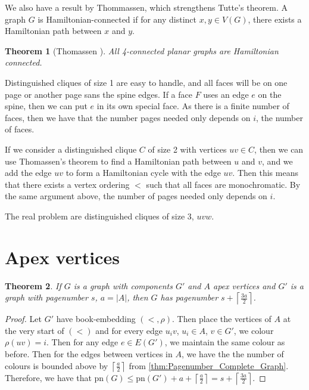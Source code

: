 \documentclass[]{report}
\newcommand{\pn}{\text{pn}}
\newtheorem{theorem}{Theorem}
\theoremstyle{definition}
\numberwithin{theorem}{section}
\numberwithin{equation}{section}
\begin{document}
We also have a result by Thommassen, which strengthens Tutte's theorem. A graph $G$ is Hamiltonian-connected if for any distinct $x, y \in V(G)$, there exists a Hamiltonian path between $x$ and $y$.
\begin{theorem}[Thomassen \cite{thomassenTheoremPathsPlanar1983}]\label{thm:4 Connected Planar Ham-Connected}
	All 4-connected planar graphs are Hamiltonian connected.
\end{theorem}
Distinguished cliques of size 1 are easy to handle, and all faces will be on one page or another page sans the spine edges. If a face $F$ uses an edge $e$ on the spine, then we can put $e$ in its own special face. As there is a finite number of faces, then we have that the number pages needed only depends on $i$, the number of faces.

If we consider a distinguished clique $C$ of size 2 with vertices $uv \in C$, then we can use Thomassen's theorem to find a Hamiltonian path between $u$ and $v$, and we add the edge $uv$ to form a Hamiltonian cycle with the edge $uv$. Then this means that there exists a vertex ordering $<$ such that all faces are monochromatic. By the same argument above, the number of pages needed only depends on $i$.

The real problem are distinguished cliques of size $3$, $uvw$. 

\section{Apex vertices}
\begin{theorem}
	If $G$ is a graph with components $G'$ and $A$ apex vertices and $G'$ is a graph with pagenumber $s$, $a = |A|$, then $G$ has pagenumber $s + \left\lceil \frac{3a}{2}\right\rceil$. 
\end{theorem}
\begin{proof}
	Let $G'$ have book-embedding $(<, \rho)$. Then place the vertices of $A$ at the very start of $(<)$ and for every edge $u_iv$, $u_i \in A$, $v \in G'$, we colour $\rho(uv) = i$. Then for any edge $e \in E(G')$, we maintain the same colour as before. Then for the edges between vertices in $A$, we have the the number of colours is bounded above by $\left\lceil \frac{a}{2} \right\rceil$ from \cref{thm:Pagenumber_Complete_Graph}. Therefore, we have that $\pn(G) \leq \pn(G') + a + \left\lceil \frac{a}{2} \right\rceil =s + \left\lceil \frac{3a}{2}\right\rceil$. 
\end{proof}
\end{document}
